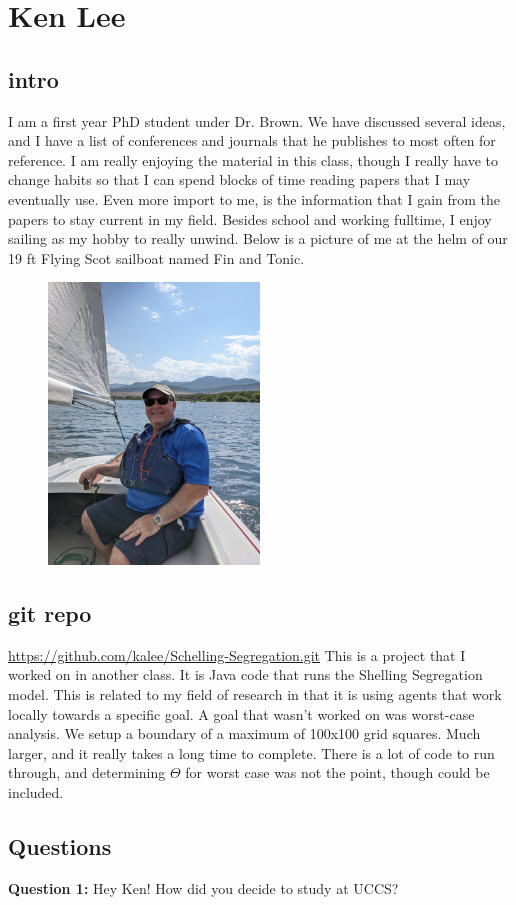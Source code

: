 \section{Ken Lee}
\subsection{intro}
I am a first year PhD student under Dr. Brown.  
We have discussed several ideas, and I have a list of conferences and journals that he publishes to most often for reference.
I am really enjoying the material in this class, though I really have to change habits so that I can spend blocks of time reading papers that I may eventually use.  
Even more import to me, is the information that I gain from the papers to stay current in my field.
Besides school and working fulltime, I enjoy sailing as my hobby to really unwind.  
Below is a picture of me at the helm of our 19 ft Flying Scot sailboat named Fin and Tonic.
\begin{figure}[!htb]
\centering
\includegraphics[width=0.5\textwidth]{sailing_flyingscot.jpg}
\end{figure}

\subsection{git repo}
\url{https://github.com/kalee/Schelling-Segregation.git} This is a project that I worked on in another class.  
It is Java code that runs the Shelling Segregation model.  
This is related to my field of research in that it is using agents that work locally towards a specific goal.  
A goal that wasn't worked on was worst-case analysis.  
We setup a boundary of a maximum of 100x100 grid squares.  
Much larger, and it really takes a long time to complete.  
There is a lot of code to run
through, and determining $\Theta$ for worst case was not the point, though could be included.

\subsection{Questions}
\textbf{Question 1:} Hey Ken! How did you decide to study at UCCS?
